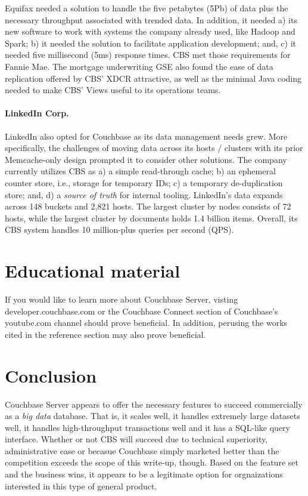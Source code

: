 \documentclass[9pt,twocolumn,twoside]{styles/osajnl}
\begin{document}
Equifax needed a solution to handle the five petabytes (5Pb) of data plus the
necessary throughput associated with trended data.  In addition, it needed a)
its new software to work with systems the company already used, like Hadoop and
Spark; b) it needed the solution to facilitate application development; and, c)
it needed five millisecond (5ms) response times.  CBS met those requirements for
Fannie Mae.  The mortgage underwriting GSE also found the ease of data
replication offered by CBS' XDCR attractive, as well as the minimal Java coding
needed to make CBS' Views useful to its operations teams. 
\cite{www-fanniemae-equifax-couchbaseconnect}

\paragraph{LinkedIn Corp.}
LinkedIn also opted for Couchbase as its data management needs grew.  More
specifically, the challenges of moving data across its hosts / clusters with its prior Memcache-only design prompted it to consider other solutions.  The company currently utilizes CBS as a) a simple read-through cache; b) an ephemeral counter store, i.e., storage for temporary IDs; c) a temporary de-duplication store; and, d) a \textit{source of truth} for internal tooling.  LinkedIn's data expands across 148 buckets and 2,821 hosts.  The largest cluster by nodes consists of 72 hosts, while the largest cluster by documents holds 1.4 billion items.  Overall, its CBS system handles 10 million-plus queries per second (QPS). \cite{www-linkedin-couchbaseconnect}

\section{Educational material}

If you would like to learn more about Couchbase Server, visting developer.couchbase.com or the Couchbase Connect section of Couchbase's youtube.com channel should prove beneficial.  In addition, perusing the works cited in the reference section may also prove beneficial.

\section{Conclusion}

Couchbase Server appears to offer the necessary features to succeed commercially as a \textit{big data} database.  That is, it scales well, it handles extremely large datasets well, it handles high-throughput transactions well and it has a SQL-like query interface.  Whether or not CBS will succeed due to technical superiority, administrative ease or becasue Couchbase simply marketed better than the competition exceeds the scope of this write-up, though.  Based on the feature set and the business wins, it appears to be a legitimate option for orgnaizations interested in this type of general product.
\end{document}
